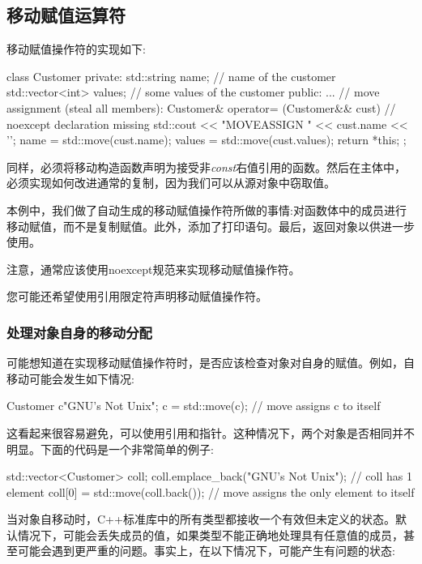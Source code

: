 \subsection{移动赋值运算符}

移动赋值操作符的实现如下:

\begin{cppcode}
class Customer {
	private:
	std::string name; // name of the customer
	std::vector<int> values; // some values of the customer
	public:
	...
	// move assignment (steal all members):
	Customer& operator= (Customer&& cust) { // noexcept declaration missing
		std::cout << "MOVEASSIGN " << cust.name << '\n';
		name = std::move(cust.name);
		values = std::move(cust.values);
		return *this;
	}
};
\end{cppcode}

同样，必须将移动构造函数声明为接受非\textit{const}右值引用的函数。然后在主体中，必须实现如何改进通常的复制，因为我们可以从源对象中窃取值。

本例中，我们做了自动生成的移动赋值操作符所做的事情:对函数体中的成员进行移动赋值，而不是复制赋值。此外，添加了打印语句。最后，返回对象以供进一步使用。

注意，通常应该使用noexcept规范来实现移动赋值操作符。

您可能还希望使用引用限定符声明移动赋值操作符。

\subsubsection{处理对象自身的移动分配}

可能想知道在实现移动赋值操作符时，是否应该检查对象对自身的赋值。例如，自移动可能会发生如下情况:

\begin{cppcode}
Customer c{"GNU's Not Unix"};
c = std::move(c); // move assigns c to itself
\end{cppcode}

这看起来很容易避免，可以使用引用和指针。这种情况下，两个对象是否相同并不明显。下面的代码是一个非常简单的例子:

\begin{cppcode}
std::vector<Customer> coll;
coll.emplace_back("GNU's Not Unix"); // coll has 1 element
coll[0] = std::move(coll.back()); // move assigns the only element to itself
\end{cppcode}

当对象自移动时，C++标准库中的所有类型都接收一个有效但未定义的状态。默认情况下，可能会丢失成员的值，如果类型不能正确地处理具有任意值的成员，甚至可能会遇到更严重的问题。事实上，在以下情况下，可能产生有问题的状态:

